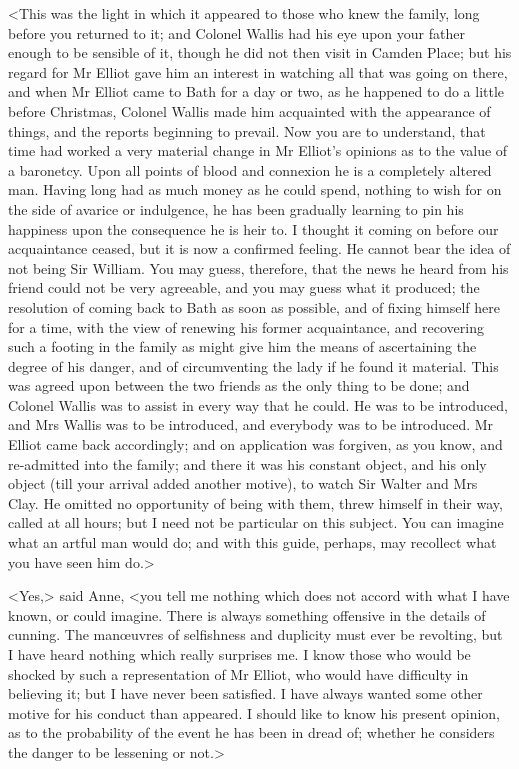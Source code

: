 <This was the light in which it appeared to those who knew the family, long before you returned to it; and Colonel Wallis had his eye upon your father enough to be sensible of it, though he did not then visit in Camden Place; but his regard for Mr Elliot gave him an interest in watching all that was going on there, and when Mr Elliot came to Bath for a day or two, as he happened to do a little before Christmas, Colonel Wallis made him acquainted with the appearance of things, and the reports beginning to prevail. Now you are to understand, that time had worked a very material change in Mr Elliot's opinions as to the value of a baronetcy. Upon all points of blood and connexion he is a completely altered man. Having long had as much money as he could spend, nothing to wish for on the side of avarice or indulgence, he has been gradually learning to pin his happiness upon the consequence he is heir to. I thought it coming on before our acquaintance ceased, but it is now a confirmed feeling. He cannot bear the idea of not being Sir William. You may guess, therefore, that the news he heard from his friend could not be very agreeable, and you may guess what it produced; the resolution of coming back to Bath as soon as possible, and of fixing himself here for a time, with the view of renewing his former acquaintance, and recovering such a footing in the family as might give him the means of ascertaining the degree of his danger, and of circumventing the lady if he found it material. This was agreed upon between the two friends as the only thing to be done; and Colonel Wallis was to assist in every way that he could. He was to be introduced, and Mrs Wallis was to be introduced, and everybody was to be introduced. Mr Elliot came back accordingly; and on application was forgiven, as you know, and re-admitted into the family; and there it was his constant object, and his only object (till your arrival added another motive), to watch Sir Walter and Mrs Clay. He omitted no opportunity of being with them, threw himself in their way, called at all hours; but I need not be particular on this subject. You can imagine what an artful man would do; and with this guide, perhaps, may recollect what you have seen him do.>

<Yes,> said Anne, <you tell me nothing which does not accord with what I have known, or could imagine. There is always something offensive in the details of cunning. The manœuvres of selfishness and duplicity must ever be revolting, but I have heard nothing which really surprises me. I know those who would be shocked by such a representation of Mr Elliot, who would have difficulty in believing it; but I have never been satisfied. I have always wanted some other motive for his conduct than appeared. I should like to know his present opinion, as to the probability of the event he has been in dread of; whether he considers the danger to be lessening or not.>

